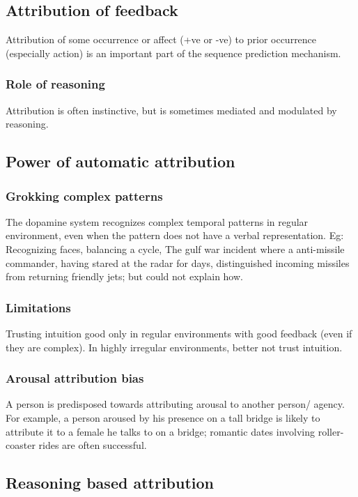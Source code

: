 \documentclass[oneside, article]{memoir}
\begin{document}
\subsection{Attribution of feedback}
Attribution of some occurrence or affect (+ve or -ve) to prior occurrence (especially action) is an important part of the sequence prediction mechanism.

\subsubsection{Role of reasoning}
Attribution is often instinctive, but is sometimes mediated and modulated by reasoning.

\subsection{Power of automatic attribution}
\subsubsection{Grokking complex patterns}
The dopamine system recognizes complex temporal patterns in regular environment, even when the pattern does not have a verbal representation. Eg: Recognizing faces, balancing a cycle, The gulf war incident where a anti-missile commander, having stared at the radar for days, distinguished incoming missiles from returning friendly jets; but could not explain how.

\subsubsection{Limitations}
Trusting intuition good only in regular environments with good feedback (even if they are complex). In highly irregular environments, better not trust intuition.

\subsubsection{Arousal attribution bias}
A person is predisposed towards attributing arousal to another person/ agency. For example, a person aroused by his presence on a tall bridge is likely to attribute it to a female he talks to on a bridge; romantic dates involving roller-coaster rides are often successful.

\subsection{Reasoning based attribution}
\end{document}
